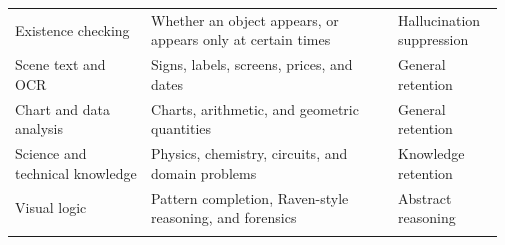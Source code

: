 {\begin{longtable}{@{}p{0.27\linewidth}p{0.49\linewidth}p{0.21\linewidth}@{}}
Existence checking & Whether an object appears, or appears only at certain times & Hallucination suppression \\
Scene text and OCR & Signs, labels, screens, prices, and dates & General retention \\
Chart and data analysis & Charts, arithmetic, and geometric quantities & General retention \\
Science and technical knowledge & Physics, chemistry, circuits, and domain problems & Knowledge retention \\
Visual logic & Pattern completion, Raven-style reasoning, and forensics & Abstract reasoning \\
\bottomrule
\label{tab:qa_families}
\end{longtable}
}

